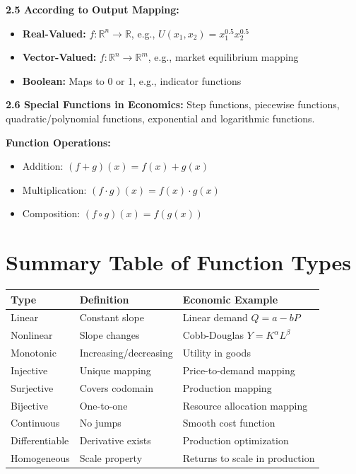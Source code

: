 \begin{tcolorbox}[sectionbox]
\textbf{2.5 According to Output Mapping:}
\begin{itemize}
    \item \textbf{Real-Valued:} $f:\mathbb{R}^n \to \mathbb{R}$, e.g., $U(x_1,x_2)=x_1^{0.5}x_2^{0.5}$
    \item \textbf{Vector-Valued:} $f:\mathbb{R}^n \to \mathbb{R}^m$, e.g., market equilibrium mapping
    \item \textbf{Boolean:} Maps to 0 or 1, e.g., indicator functions
\end{itemize}



\textbf{2.6 Special Functions in Economics:}
Step functions, piecewise functions, quadratic/polynomial functions, exponential and logarithmic functions.
\end{tcolorbox}

\begin{tcolorbox}[sectionbox]
\textbf{Function Operations:}
\begin{itemize}
    \item Addition: $(f+g)(x) = f(x) + g(x)$
    \item Multiplication: $(f \cdot g)(x) = f(x) \cdot g(x)$
    \item Composition: $(f \circ g)(x) = f(g(x))$
\end{itemize}
\end{tcolorbox}

\section*{ Summary Table of Function Types}
\begin{tcolorbox}[examplebox]
\begin{tabular}{|l|l|l|}
\hline
\textbf{Type} & \textbf{Definition} & \textbf{Economic Example} \\
\hline
Linear & Constant slope & Linear demand $Q=a-bP$ \\
Nonlinear & Slope changes & Cobb-Douglas $Y=K^\alpha L^\beta$ \\
Monotonic & Increasing/decreasing & Utility in goods \\
Injective & Unique mapping & Price-to-demand mapping \\
Surjective & Covers codomain & Production mapping \\
Bijective & One-to-one & Resource allocation mapping \\
Continuous & No jumps & Smooth cost function \\
Differentiable & Derivative exists & Production optimization \\
Homogeneous & Scale property & Returns to scale in production \\
\hline
\end{tabular}
\end{tcolorbox}






